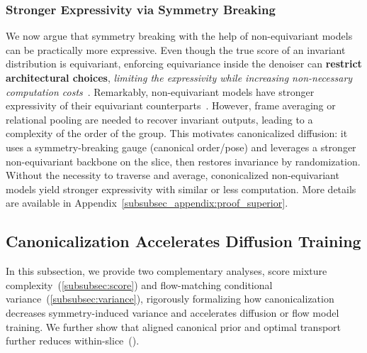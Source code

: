 \documentclass{article}
\theoremstyle{plain}
\theoremstyle{definition}
\theoremstyle{remark}
\newcommand{\1}{\mathbf{1}}
\begin{document}
\subsubsection{Stronger Expressivity via Symmetry Breaking}\label{subsubsec:superior}

We now argue that symmetry breaking with the help of non-equivariant models can be practically more expressive. 
Even though the true score of an invariant distribution is equivariant, enforcing equivariance inside the denoiser can \textbf{restrict architectural choices}, \emph{limiting the expressivity while increasing non-necessary computation costs}~\citep{yan2023swingnn}. 
Remarkably, non-equivariant models have stronger expressivity of their equivariant counterparts~\citep{zhang2021labeling,klWL}. However, frame averaging or relational pooling are needed to recover invariant outputs, leading to a complexity of the order of the group.
This motivates canonicalized diffusion: it uses a symmetry-breaking gauge (canonical order/pose) and leverages a stronger non-equivariant backbone on the slice, then restores invariance by randomization. Without the necessity to traverse and average, cononicalized non-equivariant models yield stronger expressivity with similar or less computation. More details are available in Appendix~\ref{subsubsec_appendix:proof_superior}.


\subsection{Canonicalization Accelerates Diffusion Training}\label{subsec:accelerate}

In this subsection, we provide two complementary analyses, score mixture complexity~(\cref{subsubsec:score}) and flow-matching conditional variance~(\cref{subsubsec:variance}), rigorously formalizing how canonicalization decreases symmetry-induced variance and accelerates diffusion or flow model training. We further show that aligned canonical prior and optimal transport further reduces within-slice~().
\end{document}
